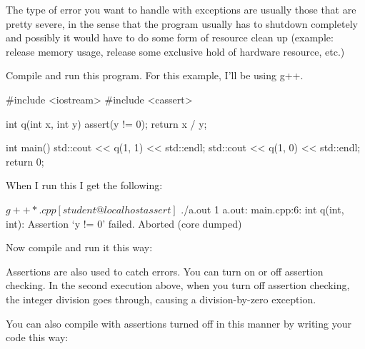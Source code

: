 The type of error you want to handle with exceptions are usually those
that are pretty severe, in the sense that the program usually has to
shutdown completely and possibly it would have to do some form of
resource clean up (example: release memory usage, release some exclusive
hold of hardware resource, etc.)

\newpage{}

Compile and run this program. For this example, I'll be
using g++.

\begin{console}
#include <iostream>
#include <cassert>

int q(int x, int y)
{   
    assert(y != 0);
    return x / y;
}

int main()
{   
    std::cout << q(1, 1) << std::endl;
    std::cout << q(1, 0) << std::endl;
    return 0;
}
\end{console}

When I run this I get the following:

\begin{console}
$ g++ *.cpp
[student@localhost assert]$ ./a.out
1
a.out: main.cpp:6: int q(int, int): Assertion `y != 0'{}
failed.
Aborted (core dumped)
\end{console}

Now compile and run it this way:

Assertions are also used to catch errors. You can turn on or off
assertion checking. In the second execution above, when you turn off
assertion checking, the integer division goes through, causing a
division-by-zero exception.

You can also compile with assertions turned off in this manner by
writing your code this way:


